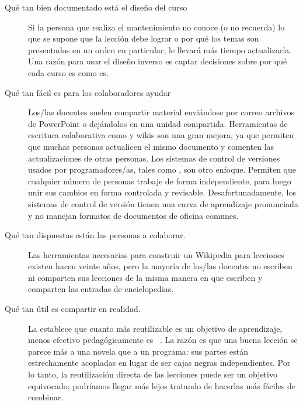 \begin{description}
 
\item[Qué tan bien documentado está el diseño del curso]
  Si la persona que realiza el mantenimiento no conoce (o no recuerda)
  lo que se supone que la lección debe lograr
  o por qué los temas son presentados en un orden en particular,
  le llevará más tiempo actualizarla.
  Una razón para usar el diseño inverso
  es captar decisiones sobre por qué cada curso es como es.
 
\item[Qué tan fácil es para los colaboradores ayudar]
  Los/las docentes suelen compartir material enviándose por correo archivos de PowerPoint o dejándolos en una unidad compartida.
  Herramientas de escritura colaborativa como  y wikis
  son una gran mejora,
  ya que permiten que muchas personas actualicen el mismo documento
  y comenten las actualizaciones de otras personas.
  Los sistemas de control de versiones usados por programadores/as,
  tales como ,
  son otro enfoque.
  Permiten que cualquier número de personas trabaje de forma independiente,
  para luego unir sus cambios en forma controlada y revisable.
  Desafortunadamente,
  los sistemas de control de versión tienen una curva de aprendizaje pronunciada
   y no manejan formatos de documentos de oficina comunes.
 
\item[Qué tan dispuestas están las personas a colaborar.]
  Las herramientas necesarias para construir un Wikipedia para lecciones
  existen hacen veinte años,
  pero la mayoría de los/las docentes no escriben ni comparten sus lecciones
  de la misma manera en que escriben y comparten las entradas de enciclopedias.
 
\item[Qué tan útil es compartir en realidad.]
  La  establece que
  cuanto más reutilizable es un objetivo de aprendizaje,
  menos efectivo pedagógicamente es ~\cite{Wile2002}.
  La razón es que una buena lección se parece más a una novela que a un programa:
  sus partes están estrechamente acopladas en lugar de ser cajas negras independientes.
  Por lo tanto, la reutilización directa de las lecciones puede ser un objetivo equivocado;
  podríamos llegar más lejos tratando de hacerlas más fáciles de combinar.
 \end{description}

